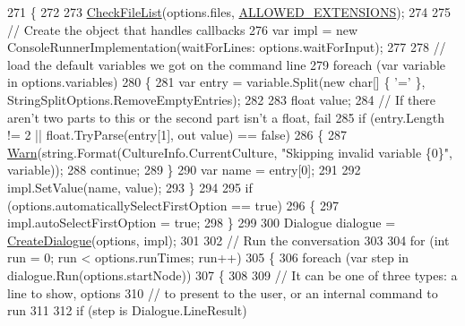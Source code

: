 \begin{DoxyCode}
271         \{
272 
273             \hyperlink{a00174_ad77564b25725a771f0fd4da430582e6f}{CheckFileList}(options.files, \hyperlink{a00174_a0979de7ea02c8c0375b8220a12e6575e}{ALLOWED\_EXTENSIONS});
274 
275             \textcolor{comment}{// Create the object that handles callbacks}
276             var impl = \textcolor{keyword}{new} ConsoleRunnerImplementation(waitForLines: options.waitForInput);
277 
278             \textcolor{comment}{// load the default variables we got on the command line}
279             \textcolor{keywordflow}{foreach} (var variable \textcolor{keywordflow}{in} options.variables)
280             \{
281                 var entry = variable.Split(\textcolor{keyword}{new} \textcolor{keywordtype}{char}[] \{ \textcolor{charliteral}{'='} \}, StringSplitOptions.RemoveEmptyEntries);
282 
283                 \textcolor{keywordtype}{float} value;
284                 \textcolor{comment}{// If there aren't two parts to this or the second part isn't a float, fail}
285                 \textcolor{keywordflow}{if} (entry.Length != 2 || \textcolor{keywordtype}{float}.TryParse(entry[1], out value) == \textcolor{keyword}{false})
286                 \{
287                     \hyperlink{a00174_a979bb6f049b6c5294f745a19e24ddd9d}{Warn}(\textcolor{keywordtype}{string}.Format(CultureInfo.CurrentCulture, \textcolor{stringliteral}{"Skipping invalid variable \{0\}"}, 
      variable));
288                     \textcolor{keywordflow}{continue};
289                 \}
290                 var name = entry[0];
291 
292                 impl.SetValue(name, value);
293             \}
294 
295             \textcolor{keywordflow}{if} (options.automaticallySelectFirstOption == \textcolor{keyword}{true})
296             \{
297                 impl.autoSelectFirstOption = \textcolor{keyword}{true};
298             \}
299 
300             Dialogue dialogue = \hyperlink{a00174_aab244361a510cee18ad2f636d110e0d5}{CreateDialogue}(options, impl);
301 
302             \textcolor{comment}{// Run the conversation}
303 
304             \textcolor{keywordflow}{for} (\textcolor{keywordtype}{int} run = 0; run < options.runTimes; run++)
305             \{
306                 \textcolor{keywordflow}{foreach} (var step \textcolor{keywordflow}{in} dialogue.Run(options.startNode))
307                 \{
308 
309                     \textcolor{comment}{// It can be one of three types: a line to show, options}
310                     \textcolor{comment}{// to present to the user, or an internal command to run}
311 
312                     \textcolor{keywordflow}{if} (step is Dialogue.LineResult)

\end{DoxyCode}
